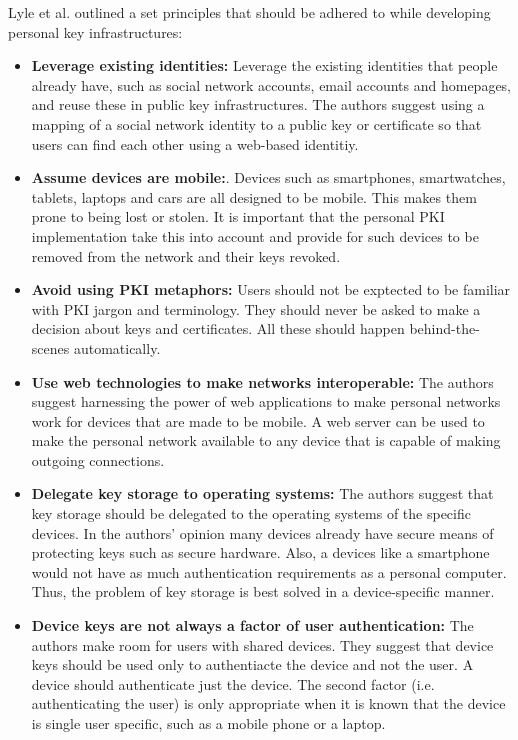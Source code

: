Lyle et al.\cite{Lyle2013} outlined a set principles that should be adhered to while developing personal key infrastructures:
\begin{itemize}

	\item \textbf{Leverage existing identities:} Leverage the existing identities that people already have, such as social network accounts, email 				accounts and homepages, and reuse these in public key infrastructures. The authors suggest using a mapping of a social network identity to a 			public key or certificate so that users can find each other using a web-based identitiy.\\

	\item \textbf{Assume devices are mobile:}. Devices such as smartphones, smartwatches, tablets, laptops and cars are all designed to be 					mobile. This makes them prone to being lost or stolen. It is important that the personal PKI implementation take this into account and provide 			for such devices to be removed from the network and their keys revoked.\\
	
	\item \textbf{Avoid using PKI metaphors:} Users should not be exptected to be familiar with PKI jargon and terminology. They should never be 			asked to make a decision about keys and certificates. All these should happen behind-the-scenes automatically.\\
	
	\item \textbf{Use web technologies to make networks interoperable:} The authors suggest harnessing the power of web applications to make 			personal networks work for devices that are made to be mobile. A web server can be used to make the personal network available to any 					device that is capable of making outgoing connections.\\
	
	\item \textbf{Delegate key storage to operating systems:} The authors suggest that key storage should be delegated to the operating 						systems of the specific devices. In the authors' opinion many devices already have secure means of protecting keys such as secure hardware. 				Also, a devices like a smartphone would not have as much authentication requirements as a personal computer. Thus, the problem of key 					storage is best solved in a device-specific manner.\\
	
	\item \textbf{Device keys are not always a factor of user authentication:} The authors make room for users with shared devices. They suggest 			that device keys should be used only to authentiacte the device and not the user. A device should authenticate just the device. The second 				factor (i.e. authenticating the user) is only appropriate when it is known that the device is single user specific, such as a mobile phone or a 					laptop.\\
\end{itemize}

